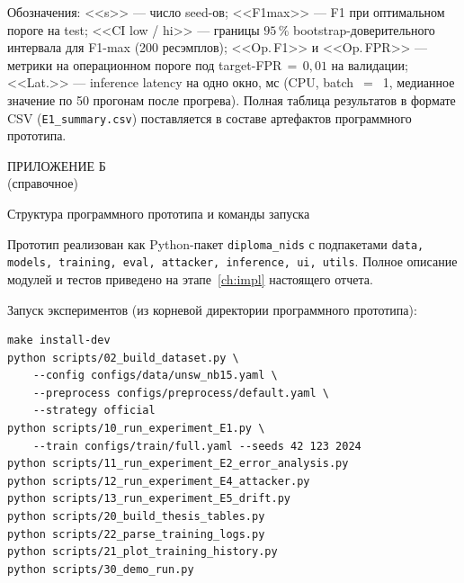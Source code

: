 \noindent
Обозначения: <<s>> --- число seed-ов; <<F1max>> --- F1 при
оптимальном пороге на test; <<CI low / hi>> --- границы
$95\,\%$ bootstrap-доверительного интервала для F1-max
(200 ресэмплов); <<Op.\,F1>> и <<Op.\,FPR>> --- метрики на
операционном пороге под target-FPR$\,=\,0{,}01$ на валидации;
<<Lat.>> --- inference latency на одно окно, мс
(CPU, batch~$=$~1, медианное значение по 50 прогонам после
прогрева). Полная таблица результатов в формате CSV
(\verb|E1_summary.csv|) поставляется в составе артефактов
программного прототипа.

\newpage
\renewcommand{\thetable}{Б.\arabic{table}}
\renewcommand{\thefigure}{Б.\arabic{figure}}
\setcounter{table}{0}
\setcounter{figure}{0}

\begin{center}
ПРИЛОЖЕНИЕ Б\\
(справочное)

\medskip

Структура программного прототипа и команды запуска
\end{center}
\label{app:project}

\vspace{6pt}

Прототип реализован как Python-пакет \texttt{diploma\_nids} с
подпакетами \texttt{data, models, training, eval, attacker,
inference, ui, utils}. Полное описание модулей и тестов приведено на
этапе~\ref{ch:impl} настоящего отчета.

\medskip

Запуск экспериментов (из корневой директории программного
прототипа):

\begin{verbatim}
make install-dev
python scripts/02_build_dataset.py \
    --config configs/data/unsw_nb15.yaml \
    --preprocess configs/preprocess/default.yaml \
    --strategy official
python scripts/10_run_experiment_E1.py \
    --train configs/train/full.yaml --seeds 42 123 2024
python scripts/11_run_experiment_E2_error_analysis.py
python scripts/12_run_experiment_E4_attacker.py
python scripts/13_run_experiment_E5_drift.py
python scripts/20_build_thesis_tables.py
python scripts/22_parse_training_logs.py
python scripts/21_plot_training_history.py
python scripts/30_demo_run.py
\end{verbatim}

\newpage
\renewcommand{\thetable}{В.\arabic{table}}
\renewcommand{\thefigure}{В.\arabic{figure}}
\setcounter{table}{0}
\setcounter{figure}{0}

